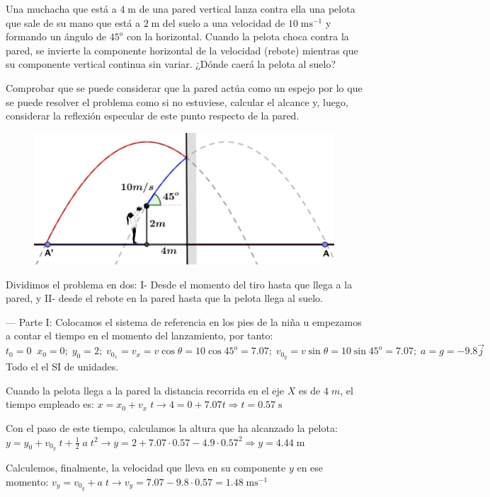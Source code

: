 \begin{prob}
Una muchacha que está a $4\;\mathrm{m}$ de una pared vertical lanza contra ella una pelota que sale de su mano que está a $2 \; \mathrm{m}$ del suelo a una velocidad de $10\;\mathrm{ms}^{-1}$ y formando un ángulo de $45^o$ con la horizontal. Cuando la pelota choca contra la pared, se invierte la componente horizontal de la velocidad (rebote) mientras	 que su componente vertical continua sin variar. ¿Dónde caerá la pelota al suelo?

Comprobar que se puede considerar que la pared actúa como un espejo por lo que se puede resolver el problema como si no estuviese, calcular el alcance y, luego, considerar la reflexión especular de este punto respecto de la pared.
\end{prob}
\begin{figure}[H]
		\centering
		\includegraphics[width=.9\textwidth]{imagenes/imagenes02/T02IM24.png}
		\end{figure}
Dividimos el problema en dos: I- Desde el momento del tiro hasta que llega a la pared, y II- desde el rebote en la pared hasta que la pelota llega al suelo.

--- Parte I:  Colocamos el sistema de referencia en los pies de la niña u empezamos a contar el tiempo en el momento del lanzamiento, por tanto: $t_0=0\;\; x_0=0;\; y_0=2;\; v_{0_x}=v_x=v\cos \theta=10\cos 45^o=7.07;\; v_{0_y}=v\sin \theta=10\sin 45^o=7.07;\; a=g=-9.8\vec j\;$ Todo el el SI de unidades.

Cuando la pelota llega a la pared la distancia recorrida en el eje $X$ es de $4\;m$, el tiempo empleado es: $x=x_0+v_x\;t \to 4=0+7.07t \Rightarrow t=0.57\; \mathrm{s}$

Con el paso de este tiempo, calculamos la altura que ha alcanzado la pelota: $y=y_0+v_{0_y}\;t+\frac 1 2 \;a\;t^2 \to y=2+7.07\cdot 0.57-4.9\cdot 0.57^2 \Rightarrow y=4.44\; \mathrm{m}$

Calculemos, finalmente, la velocidad que lleva en su componente $y$ en ese momento: $v_y=v_{0_y}+a\; t \to v_y=7.07-9.8\cdot 0.57=1.48\; \mathrm{ms}^{-1}$

